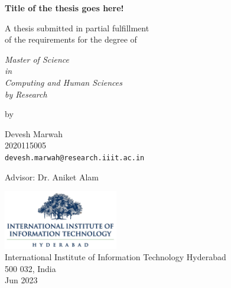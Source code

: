 \thispagestyle{empty}
\begin{center}
\vspace*{1.5cm}
{\Large \bf Title of the thesis goes here!}

\vspace*{2.2cm}
{\large A thesis submitted in partial fulfillment\\}
{\large  of the requirements for the degree of \\}

\vspace*{1cm}
{\it {\large Master of Science } \\
{\large in\\}
{\large Computing and Human Sciences \\}
{\large by Research \\}}


\vspace*{0.8cm}
{\large by}

\vspace*{6mm}
{\large Devesh Marwah\\}
{\large 2020115005\\
{\small \tt devesh.marwah@research.iiit.ac.in}}

\vspace*{5mm}
{\large Advisor: Dr. Aniket Alam\\}


\vspace*{3.0cm}
{\includegraphics[width=5cm]{figures/iiit.png}\\}
{\large International Institute of Information Technology Hyderabad\\}
{\large 500 032, India\\}
\vspace*{5mm}
{\large Jun 2023\\}
\end{center}